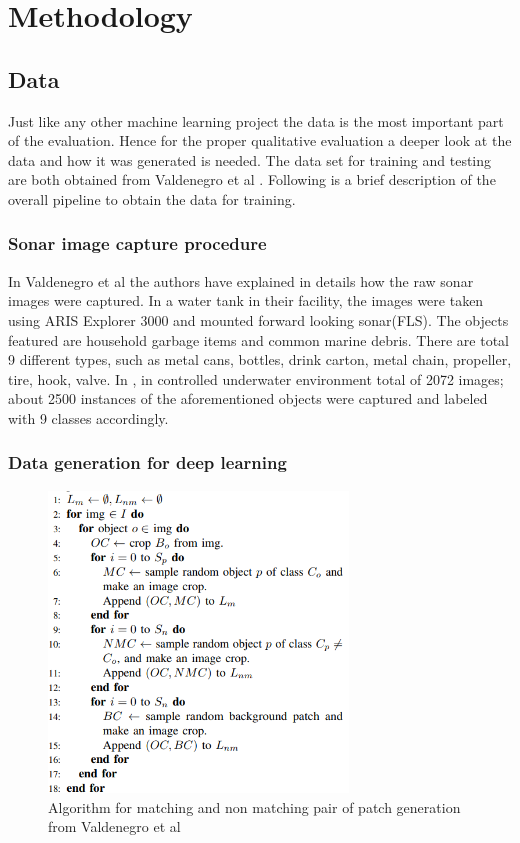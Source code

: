 \chapter{Methodology}

\section{Data}
Just like any other machine learning project the data is the most important part of the evaluation. Hence for the proper qualitative evaluation a deeper look at the data and how it was generated is needed.
The data set for training and testing are both obtained from Valdenegro et al \cite{stateoftheart}. Following is a brief description of the overall pipeline to obtain the data for training.

\subsection{Sonar image capture procedure}
In Valdenegro et al \cite{stateoftheart} the authors have explained in details how the raw sonar images were captured. In a water tank in their facility, the images were taken using ARIS Explorer 3000 and
mounted forward looking sonar(FLS). The objects featured are household garbage items and common marine debris. There are total 9 different types, such as metal cans, bottles, drink carton, metal chain, propeller, tire, hook, valve. 
In \cite{stateoftheart}, in controlled underwater environment total of 2072 images; about 2500 instances of the aforementioned objects were captured and labeled with 9 classes accordingly.

\subsection{Data generation for deep learning}
\begin{figure}[ht]
\centering
\includegraphics[height= 8cm]{images/densenet/training_data_generation}
\caption{Algorithm for matching and non matching pair of patch generation from Valdenegro et al \cite{stateoftheart}}
\label{fig:training_data_generation}
\end{figure}

